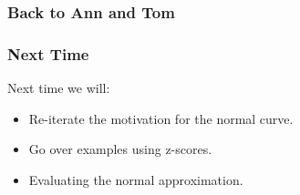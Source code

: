 \documentclass[handout]{beamer}
\begin{document}
\begin{frame}
\frametitle{Back to Ann and Tom}

%
%


\end{frame}





\begin{frame}[fragile]
\frametitle{Next Time}

Next time we will:

\begin{itemize}
\item Re-iterate the motivation for the normal curve.
\item Go over examples using z-scores.
\item Evaluating the normal approximation.
\end{itemize}


\end{frame}
\end{document}
